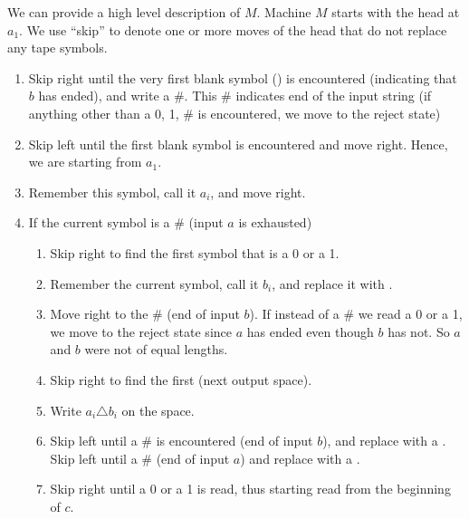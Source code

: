 \documentclass[addpoints,a4paper]{exam}
\begin{document}
\begin{questions}
\begin{parts}
\begin{solution}
      We can provide a high level description of $M$. Machine $M$ starts with the head at $ a_1 $. We use ``skip'' to denote one or more moves of the head that do not replace any tape symbols. \vspace*{-2mm}
      \begin{enumerate}
        \item Skip right until the very first blank symbol (\textvisiblespace) is encountered (indicating that $b$ has ended), and write a \#. This \# indicates end of the input string (if anything other than a 0, 1, \# is encountered, we move to the reject state) \vspace*{-1mm}
        \item Skip left until the first blank symbol is encountered and move right. Hence, we are starting from $a_1$.  \vspace*{-1mm}
        \item Remember this symbol, call it $a_i$, and move right. \vspace*{-1mm}
        \item If the current symbol is a \# (input $a$ is exhausted) \vspace*{-1mm} \begin{enumerate}
                \item Skip right to find the first symbol that is a 0 or a 1. \vspace*{-1mm}
                \item Remember the current symbol, call it $b_i$, and replace it with \textvisiblespace\;. \vspace*{-1mm}
                \item Move right to the \# (end of input $b$). If instead of a \# we read a 0 or a 1, we move to the reject state since $a$ has ended even though $b$ has not. So $a$ and $b$ were not of equal lengths. \vspace*{-1mm}
                \item Skip right to find the first \textvisiblespace\; (next output space). \vspace*{-1mm}
                \item Write $a_i \triangle b_i$ on the space. \vspace*{-1mm}
                \item Skip left until a \# is encountered (end of input $b$), and replace with a \textvisiblespace\;. Skip left until a \# (end of input $a$) and replace with a \textvisiblespace\;. \vspace*{-1mm}
                \item Skip right until a 0 or a 1 is read, thus starting read from the beginning of $c$. \vspace*{-1mm}

\end{enumerate}
\end{enumerate}
\end{solution}
\end{parts}
\end{questions}
\end{document}
